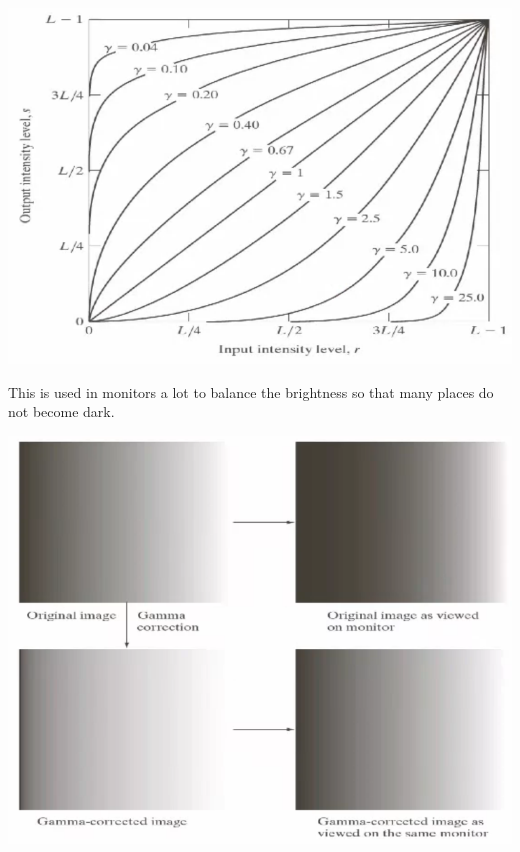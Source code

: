 \documentclass{article}
\begin{document}
    \begin{center}
        \includegraphics[scale=0.3]{img/gamma_correction.png}
    \end{center}
    This is used in monitors a lot to balance the brightness so that many places do not become dark. 
    \begin{center}
        \includegraphics[scale=0.3]{img/gamma_correction2.png}
    \end{center}
\end{document}
